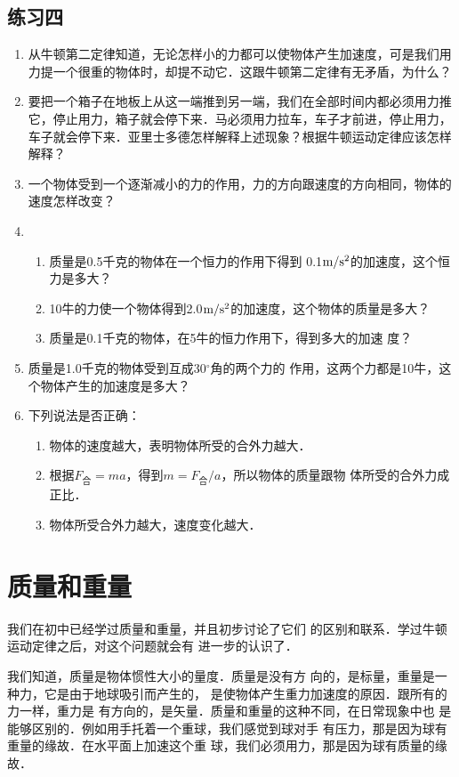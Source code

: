 \subsection*{练习四}
\begin{enumerate}
	\item 从牛顿第二定律知道，无论怎样小的力都可以使物体产生加速度，可是我们用力提一个很重的物体时，却提不动它．这跟牛顿第二定律有无矛盾，为什么？
\item 要把一个箱子在地板上从这一端推到另一端，我们在全部时间内都必须用力推它，停止用力，箱子就会停下来．马必须用力拉车，车子才前进，停止用力，车子就会停下来．亚里士多德怎样解释上述现象？根据牛顿运动定律应该怎样解释？
\item 一个物体受到一个逐渐减小的力的作用，力的方向跟速度的方向相同，物体的速度怎样改变？
\item \begin{enumerate}
\item  质量是0.5千克的物体在一个恒力的作用下得到
0.1$\text{m}/\text{s}^2$的加速度，这个恒力是多大？
\item 10牛的力使一个物体得到2.0$\text{m}/\text{s}^2$的加速度，这个物体的质量是多大？
\item 质量是0.1千克的物体，在5牛的恒力作用下，得到多大的加速
度？
\end{enumerate}
 \item 质量是1.0千克的物体受到互成30$^\circ$角的两个力的
作用，这两个力都是10牛，这个物体产生的加速度是多大？
\item 下列说法是否正确：
\begin{enumerate}
\item 物体的速度越大，表明物体所受的合外力越大．
\item 根据$F_{\text{合}}=ma$，得到$m=F_{\text{合}}/a$，所以物体的质量跟物
体所受的合外力成正比．
\item 物体所受合外力越大，速度变化越大．
\end{enumerate}


\end{enumerate}

\section{质量和重量}
我们在初中已经学过质量和重量，并且初步讨论了它们
的区别和联系．学过牛顿运动定律之后，对这个问题就会有
进一步的认识了．

我们知道，质量是物体惯性大小的量度．质量是没有方
向的，是标量，重量是一种力，它是由于地球吸引而产生的，
是使物体产生重力加速度的原因．跟所有的力一样，重力是
有方向的，是矢量．质量和重量的这种不同，在日常现象中也
是能够区别的．例如用手托着一个重球，我们感觉到球对手
有压力，那是因为球有重量的缘故．在水平面上加速这个重
球，我们必须用力，那是因为球有质量的缘故．

